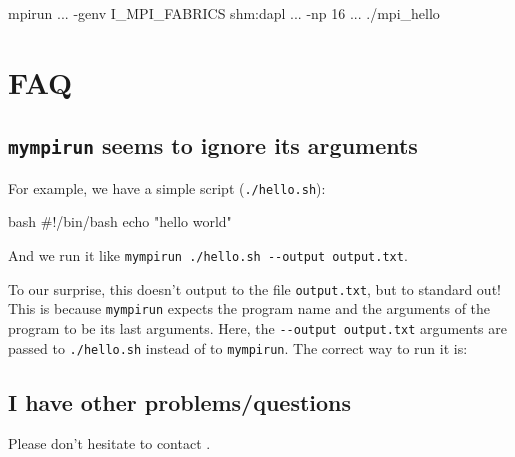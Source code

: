 \begin{prompt}
mpirun ... -genv I_MPI_FABRICS shm:dapl ... -np 16 ... ./mpi_hello
\end{prompt}

\section{FAQ}

\subsection{\texttt{mympirun} seems to ignore its arguments}

For example, we have a simple script (\lstinline|./hello.sh|):

\begin{code}{bash}
#!/bin/bash
echo "hello world"
\end{code}

And we run it like \lstinline|mympirun ./hello.sh --output output.txt|.

To our surprise, this doesn't output to the file \lstinline|output.txt|, but to standard out!
This is because \lstinline|mympirun| expects the program name and the arguments of the program to
be its last arguments. Here, the \lstinline|--output output.txt| arguments are passed to
\lstinline|./hello.sh| instead of to \lstinline|mympirun|. The correct way to run it is:

\begin{prompt}
\end{prompt}



\subsection{I have other problems/questions}

Please don't hesitate to contact \hpcinfo.
